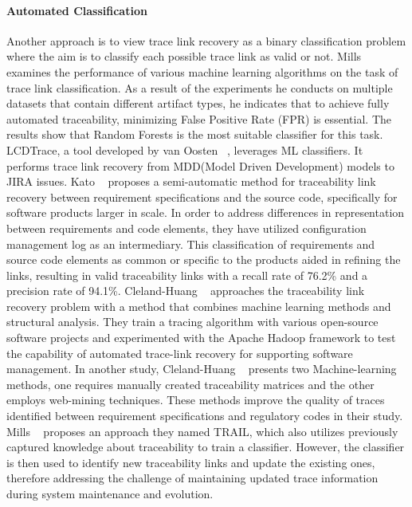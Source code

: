 \paragraph{Automated Classification} Another approach is to view trace link recovery as a binary classification problem where the aim is to classify each possible trace link as valid or not. Mills~\cite{mills-2017} examines the performance of various machine learning algorithms on the task of trace link classification. As a result of the experiments he conducts on multiple datasets that contain different artifact types, he indicates that to achieve fully automated traceability, minimizing False Positive Rate (FPR) is essential. The results show that Random Forests is the most suitable classifier for this task.
LCDTrace, a tool developed by van Oosten \etal{}~\cite{VANOOSTEN2023107226}, leverages ML classifiers. It performs trace link recovery from MDD(Model Driven Development) models to JIRA issues.
Kato \etal{}~\cite{kato-2013} proposes a semi-automatic method for traceability link recovery between requirement specifications and the source code, specifically for software products larger in scale. In order to address differences in representation between requirements and code elements, they have utilized configuration management log as an intermediary. This classification of requirements and source code elements as common or specific to the products aided in refining the links, resulting in valid traceability links with a recall rate of 76.2\% and a precision rate of 94.1\%. 
Cleland-Huang \etal{}~\cite{jane-2012} approaches the traceability link recovery problem with a method that combines machine learning methods and structural analysis. They train a tracing algorithm with various open-source software projects and experimented with the Apache Hadoop framework to test the capability of automated trace-link recovery for supporting software management.
In another study, Cleland-Huang \etal{}~\cite{cleland-2010} presents two Machine-learning methods, one requires manually created traceability matrices and the other employs web-mining techniques. These methods improve the quality of traces identified between requirement specifications and regulatory codes in their study.
Mills \etal{}~\cite{mills-2018} proposes an approach they named TRAIL, which also utilizes previously captured knowledge about traceability to train a classifier. However, the classifier is then used to identify new traceability links and update the existing ones, therefore addressing the challenge of maintaining updated trace information during system maintenance and evolution.

